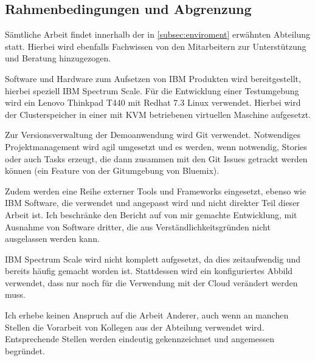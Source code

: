 \subsection{Rahmenbedingungen und Abgrenzung}

Sämtliche Arbeit findet innerhalb der in \autoref{subsec:enviroment} erwähnten Abteilung statt. Hierbei wird ebenfalls Fachwissen von den Mitarbeitern zur Unterstützung und Beratung hinzugezogen.

Software und Hardware zum Aufsetzen von IBM Produkten wird bereitgestellt, hierbei speziell IBM Spectrum Scale. Für die Entwicklung einer Testumgebung wird ein Lenovo Thinkpad T440 mit Redhat 7.3 Linux verwendet. Hierbei wird der Clusterspeicher in einer mit KVM betriebenen virtuellen Maschine aufgesetzt.

Zur Versionsverwaltung der Demoanwendung wird \gls{Git} verwendet. Notwendiges Projektmanagement wird agil umgesetzt und es werden, wenn notwendig, Stories oder auch Tasks erzeugt, die dann zusammen mit den Git Issues getrackt werden können (ein Feature von der Gitumgebung von Bluemix).

Zudem werden eine Reihe externer Tools und Frameworks eingesetzt, ebenso wie IBM Software, die verwendet und angepasst wird und nicht direkter Teil dieser Arbeit ist. Ich beschränke den Bericht auf von mir gemachte Entwicklung, mit Ausnahme von Software dritter, die aus Verständlichkeitsgründen nicht ausgelassen werden kann.

IBM Spectrum Scale wird nicht komplett aufgesetzt, da dies zeitaufwendig und bereits häufig gemacht worden ist. Stattdessen wird ein konfiguriertes Abbild verwendet, dass nur noch für die Verwendung mit der Cloud verändert werden muss.

Ich erhebe keinen Anspruch auf die Arbeit Anderer, auch wenn an manchen Stellen die Vorarbeit von Kollegen aus der Abteilung verwendet wird. Entsprechende Stellen werden eindeutig gekennzeichnet und angemessen begründet.